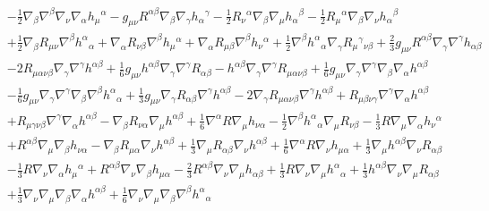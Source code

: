 \documentclass[10pt,letterpaper]{article}
\begin{document}
\begin{align*}
& -  \tfrac{1}{2} \nabla_{\beta}\nabla^{\beta}\nabla_{\nu}\nabla_{\alpha}h_{\mu}{}^{\alpha} -  g_{\mu \nu} R^{\alpha \beta} \nabla_{\beta}\nabla_{\gamma}h_{\alpha}{}^{\gamma} -  \tfrac{1}{2} R_{\nu}{}^{\alpha} \nabla_{\beta}\nabla_{\mu}h_{\alpha}{}^{\beta} -  \tfrac{1}{2} R_{\mu}{}^{\alpha} \nabla_{\beta}\nabla_{\nu}h_{\alpha}{}^{\beta} \\
&+ \tfrac{1}{2} \nabla_{\beta}R_{\mu \nu} \nabla^{\beta}h^{\alpha}{}_{\alpha} + \nabla_{\alpha}R_{\nu \beta} \nabla^{\beta}h_{\mu}{}^{\alpha} + \nabla_{\alpha}R_{\mu \beta} \nabla^{\beta}h_{\nu}{}^{\alpha} + \tfrac{1}{2} \nabla^{\beta}h^{\alpha}{}_{\alpha} \nabla_{\gamma}R_{\mu}{}^{\gamma}{}_{\nu \beta} + \tfrac{2}{3} g_{\mu \nu} R^{\alpha \beta} \nabla_{\gamma}\nabla^{\gamma}h_{\alpha \beta}\\
&- 2 R_{\mu \alpha \nu \beta} \nabla_{\gamma}\nabla^{\gamma}h^{\alpha \beta} + \tfrac{1}{6} g_{\mu \nu} h^{\alpha \beta} \nabla_{\gamma}\nabla^{\gamma}R_{\alpha \beta} -  h^{\alpha \beta} \nabla_{\gamma}\nabla^{\gamma}R_{\mu \alpha \nu \beta} + \tfrac{1}{6} g_{\mu \nu} \nabla_{\gamma}\nabla^{\gamma}\nabla_{\beta}\nabla_{\alpha}h^{\alpha \beta}\\
& -  \tfrac{1}{6} g_{\mu \nu} \nabla_{\gamma}\nabla^{\gamma}\nabla_{\beta}\nabla^{\beta}h^{\alpha}{}_{\alpha} + \tfrac{1}{3} g_{\mu \nu} \nabla_{\gamma}R_{\alpha \beta} \nabla^{\gamma}h^{\alpha \beta} - 2 \nabla_{\gamma}R_{\mu \alpha \nu \beta} \nabla^{\gamma}h^{\alpha \beta} + R_{\mu \beta \nu \gamma} \nabla^{\gamma}\nabla_{\alpha}h^{\alpha \beta}\\
& + R_{\mu \gamma \nu \beta} \nabla^{\gamma}\nabla_{\alpha}h^{\alpha \beta} -  \nabla_{\beta}R_{\nu \alpha} \nabla_{\mu}h^{\alpha \beta} + \tfrac{1}{6} \nabla^{\alpha}R \nabla_{\mu}h_{\nu \alpha} -  \tfrac{1}{2} \nabla^{\beta}h^{\alpha}{}_{\alpha} \nabla_{\mu}R_{\nu \beta} -  \tfrac{1}{3} R \nabla_{\mu}\nabla_{\alpha}h_{\nu}{}^{\alpha} \\
&+ R^{\alpha \beta} \nabla_{\mu}\nabla_{\beta}h_{\nu \alpha} -  \nabla_{\beta}R_{\mu \alpha} \nabla_{\nu}h^{\alpha \beta} + \tfrac{1}{3} \nabla_{\mu}R_{\alpha \beta} \nabla_{\nu}h^{\alpha \beta} + \tfrac{1}{6} \nabla^{\alpha}R \nabla_{\nu}h_{\mu \alpha} + \tfrac{1}{3} \nabla_{\mu}h^{\alpha \beta} \nabla_{\nu}R_{\alpha \beta}\\
& -  \tfrac{1}{3} R \nabla_{\nu}\nabla_{\alpha}h_{\mu}{}^{\alpha} + R^{\alpha \beta} \nabla_{\nu}\nabla_{\beta}h_{\mu \alpha} -  \tfrac{2}{3} R^{\alpha \beta} \nabla_{\nu}\nabla_{\mu}h_{\alpha \beta} + \tfrac{1}{3} R \nabla_{\nu}\nabla_{\mu}h^{\alpha}{}_{\alpha} + \tfrac{1}{3} h^{\alpha \beta} \nabla_{\nu}\nabla_{\mu}R_{\alpha \beta} \\
&+ \tfrac{1}{3} \nabla_{\nu}\nabla_{\mu}\nabla_{\beta}\nabla_{\alpha}h^{\alpha \beta} + \tfrac{1}{6} \nabla_{\nu}\nabla_{\mu}\nabla_{\beta}\nabla^{\beta}h^{\alpha}{}_{\alpha}
\end{align*} 
\\ \\ 
\end{document}
